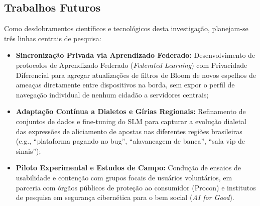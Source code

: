 \subsection{Trabalhos Futuros}

Como desdobramentos cient\'{i}ficos e tecnol\'{o}gicos desta investiga\c{c}\~{a}o, planejam-se tr\^{e}s linhas centrais de pesquisa:
\begin{itemize}
    \item \textbf{Sincroniza\c{c}\~{a}o Privada via Aprendizado Federado:} Desenvolvimento de protocolos de Aprendizado Federado (\textit{Federated Learning}) com Privacidade Diferencial para agregar atualiza\c{c}\~{o}es de filtros de Bloom de novos espelhos de amea\c{c}as diretamente entre dispositivos na borda, sem expor o perfil de navega\c{c}\~{a}o individual de nenhum cidad\~{a}o a servidores centrais;
    \item \textbf{Adapta\c{c}\~{a}o Cont\'{i}nua a Dialetos e G\'{i}rias Regionais:} Refinamento de conjuntos de dados e fine-tuning do SLM para capturar a evolu\c{c}\~{a}o dialetal das express\~{o}es de aliciamento de apostas nas diferentes regi\~{o}es brasileiras (e.g., ``plataforma pagando no bug'', ``alavancagem de banca'', ``sala vip de sinais'');
    \item \textbf{Piloto Experimental e Estudos de Campo:} Condu\c{c}\~{a}o de ensaios de usabilidade e conten\c{c}\~{a}o com grupos focais de usu\'{a}rios volunt\'{a}rios, em parceria com \'{o}rg\~{a}os p\'{u}blicos de prote\c{c}\~{a}o ao consumidor (Procon) e institutos de pesquisa em seguran\c{c}a cibern\'{e}tica para o bem social (\textit{AI for Good}).
\end{itemize}